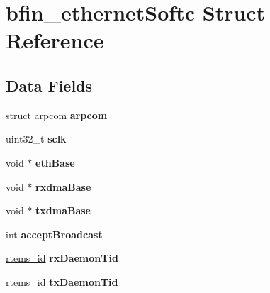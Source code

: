 \hypertarget{structbfin__ethernetSoftc}{}\section{bfin\+\_\+ethernet\+Softc Struct Reference}
\label{structbfin__ethernetSoftc}
\subsection*{Data Fields}
\begin{DoxyCompactItemize}
\item 
\mbox{\label{structbfin__ethernetSoftc_ac9589bc19ccf01624b97414772fedeb9}} 
struct arpcom {\bfseries arpcom}
\item 
\mbox{\label{structbfin__ethernetSoftc_ad26e409e426789db8ebf2022b0793ce0}} 
uint32\+\_\+t {\bfseries sclk}
\item 
\mbox{\label{structbfin__ethernetSoftc_a8ca39ea5d058e300eb16470490f02fdb}} 
void $\ast$ {\bfseries eth\+Base}
\item 
\mbox{\label{structbfin__ethernetSoftc_ac434f079d2541d2d77be10e0dde19db3}} 
void $\ast$ {\bfseries rxdma\+Base}
\item 
\mbox{\label{structbfin__ethernetSoftc_ad3f3ec0b925250e50bf68a55f252b792}} 
void $\ast$ {\bfseries txdma\+Base}
\item 
\mbox{\label{structbfin__ethernetSoftc_a4a2cc31f58a97ba741f93ef7550fd804}} 
int {\bfseries accept\+Broadcast}
\item 
\mbox{\label{structbfin__ethernetSoftc_a6104be72c21fc8cd214e6ba277902aea}} 
\mbox{\hyperlink{group__ClassicTasks_gab20892b814dced7dd4e5b9bf42becd57}{rtems\+\_\+id}} {\bfseries rx\+Daemon\+Tid}
\item 
\mbox{\label{structbfin__ethernetSoftc_a5687a498d160b7159b44b405e0de020c}} 
\mbox{\hyperlink{group__ClassicTasks_gab20892b814dced7dd4e5b9bf42becd57}{rtems\+\_\+id}} {\bfseries tx\+Daemon\+Tid}
\item 

\end{DoxyCompactItemize}
